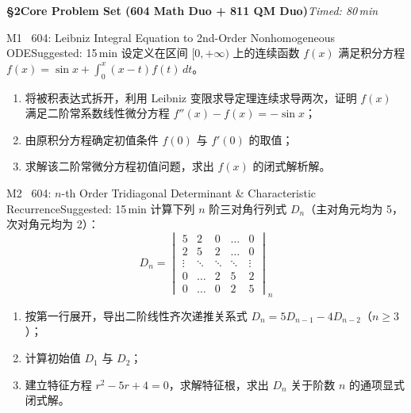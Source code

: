 \documentclass[a4paper,11pt]{article}
\begin{document}
\clearpage

{\Large\sffamily\bfseries\color{navy} \S 2\quad Core Problem Set (604 Math Duo + 811 QM Duo)}\hfill{\small\sffamily\color{mist}\itshape Timed: 80\,min}

\vspace{3pt}

\begin{problem}{M1 \textbar\ 604: Leibniz Integral Equation to 2nd-Order Nonhomogeneous ODE}{Suggested: 15\,min}
设定义在区间 $[0, +\infty)$ 上的连续函数 $f(x)$ 满足积分方程 $f(x) = \sin x + \int_0^x (x-t)f(t)\,dt$。
\begin{enumerate}[leftmargin=1.5em,itemsep=0.5pt,topsep=1pt]
  \item 将被积表达式拆开，利用 Leibniz 变限求导定理连续求导两次，证明 $f(x)$ 满足二阶常系数线性微分方程 $f''(x) - f(x) = -\sin x$；
  \item 由原积分方程确定初值条件 $f(0)$ 与 $f'(0)$ 的取值；
  \item 求解该二阶常微分方程初值问题，求出 $f(x)$ 的闭式解析解。
\end{enumerate}
\end{problem}

\vspace{2pt}

\begin{problem}{M2 \textbar\ 604: $n$-th Order Tridiagonal Determinant \& Characteristic Recurrence}{Suggested: 15\,min}
计算下列 $n$ 阶三对角行列式 $D_n$（主对角元均为 5，次对角元均为 2）：
\[
  D_n = \begin{vmatrix}
    5 & 2 & 0 & \dots & 0 \\
    2 & 5 & 2 & \dots & 0 \\
    \vdots & \ddots & \ddots & \ddots & \vdots \\
    0 & \dots & 2 & 5 & 2 \\
    0 & \dots & 0 & 2 & 5
  \end{vmatrix}_n
\]
\begin{enumerate}[leftmargin=1.5em,itemsep=0.5pt,topsep=1pt]
  \item 按第一行展开，导出二阶线性齐次递推关系式 $D_n = 5D_{n-1} - 4D_{n-2}$（$n \ge 3$）；
  \item 计算初始值 $D_1$ 与 $D_2$；
  \item 建立特征方程 $r^2 - 5r + 4 = 0$，求解特征根，求出 $D_n$ 关于阶数 $n$ 的通项显式闭式解。
\end{enumerate}
\end{problem}
\end{document}
